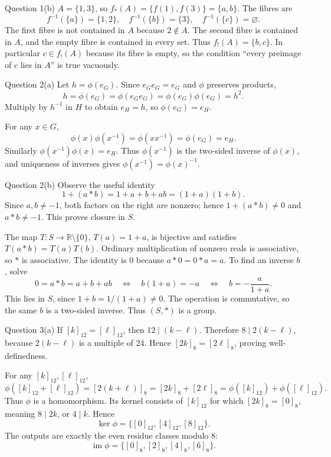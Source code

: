 \documentclass[11pt,a4paper]{article}
\newcommand{\R}{\mathbb R}
\begin{document}
\begin{worked}{Question 1(b)}
$A=\{1,3\}$, so $f_*(A)=\{f(1),f(3)\}=\{a,b\}$. The fibres are
\[
f^{-1}(\{a\})=\{1,2\},\quad f^{-1}(\{b\})=\{3\},\quad f^{-1}(\{c\})=\varnothing.
\]
The first fibre is not contained in $A$ because $2\notin A$. The second fibre is contained in $A$, and the empty fibre is contained in every set. Thus $f_!(A)=\{b,c\}$. In particular $c\in f_!(A)$ because its fibre is empty, so the condition ``every preimage of $c$ lies in $A$'' is true vacuously.
\end{worked}

\begin{worked}{Question 2(a)}
Let $h=\phi(e_G)$. Since $e_Ge_G=e_G$ and $\phi$ preserves products,
\[
h=\phi(e_G)=\phi(e_Ge_G)=\phi(e_G)\phi(e_G)=h^2.
\]
Multiply by $h^{-1}$ in $H$ to obtain $e_H=h$, so $\phi(e_G)=e_H$.

For any $x\in G$,
\[
\phi(x)\phi(x^{-1})=\phi(xx^{-1})=\phi(e_G)=e_H.
\]
Similarly $\phi(x^{-1})\phi(x)=e_H$. Thus $\phi(x^{-1})$ is the two-sided inverse of $\phi(x)$, and uniqueness of inverses gives $\phi(x^{-1})=\phi(x)^{-1}$.
\end{worked}

\begin{worked}{Question 2(b)}
Observe the useful identity
\[
1+(a*b)=1+a+b+ab=(1+a)(1+b).
\]
Since $a,b\ne-1$, both factors on the right are nonzero; hence $1+(a*b)\ne0$ and $a*b\ne-1$. This proves closure in $S$.

The map $T:S\to\R\setminus\{0\}$, $T(a)=1+a$, is bijective and satisfies $T(a*b)=T(a)T(b)$. Ordinary multiplication of nonzero reals is associative, so $*$ is associative. The identity is $0$ because $a*0=0*a=a$. To find an inverse $b$, solve
\[
0=a*b=a+b+ab
\quad\Longleftrightarrow\quad
b(1+a)=-a
\quad\Longleftrightarrow\quad
b=-\frac{a}{1+a}.
\]
This lies in $S$, since $1+b=1/(1+a)\ne0$. The operation is commutative, so the same $b$ is a two-sided inverse. Thus $(S,*)$ is a group.
\end{worked}

\begin{worked}{Question 3(a)}
If $[k]_{12}=[\ell]_{12}$, then $12\mid(k-\ell)$. Therefore $8\mid2(k-\ell)$, because $2(k-\ell)$ is a multiple of $24$. Hence $[2k]_8=[2\ell]_8$, proving well-definedness.

For any $[k]_{12},[\ell]_{12}$,
\[
\phi([k]_{12}+[\ell]_{12})=[2(k+\ell)]_8
=[2k]_8+[2\ell]_8
=\phi([k]_{12})+\phi([\ell]_{12}).
\]
Thus $\phi$ is a homomorphism. Its kernel consists of $[k]_{12}$ for which $[2k]_8=[0]_8$, meaning $8\mid2k$, or $4\mid k$. Hence
\[
\ker\phi=\{[0]_{12},[4]_{12},[8]_{12}\}.
\]
The outputs are exactly the even residue classes modulo $8$:
\[
\operatorname{im}\phi=\{[0]_8,[2]_8,[4]_8,[6]_8\}.
\]
\end{worked}
\end{document}
